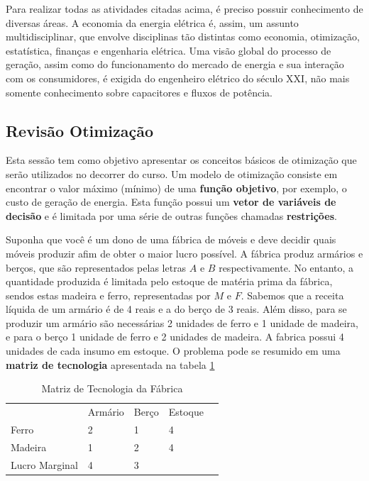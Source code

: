 Para realizar todas as atividades citadas acima, é preciso possuir
conhecimento de diversas áreas. A economia da energia elétrica é,
assim, um assunto multidisciplinar, que envolve disciplinas tão distintas
como economia, otimização, estatística, finanças e engenharia elétrica.
Uma visão global do processo de geração, assim como do funcionamento
do mercado de energia e sua interação com os consumidores, é exigida
do engenheiro elétrico do século XXI, não mais somente conhecimento
sobre capacitores e fluxos de potência. 




\subsection{Revisão Otimização}
Esta sessão tem como objetivo apresentar os conceitos básicos de otimização que serão utilizados no decorrer do curso. Um modelo de otimização consiste em encontrar o valor máximo (mínimo) de uma \textbf{função objetivo}, por exemplo, o custo de geração de energia. Esta função possui um \textbf{vetor de variáveis de decisão} e é limitada por uma série de outras funções chamadas \textbf{restrições}.

Suponha que você é um dono de uma fábrica de móveis e deve decidir quais móveis produzir afim de obter o maior lucro possível. A fábrica produz armários e berços, que são representados pelas letras $A$ e $B$ respectivamente. No entanto, a quantidade produzida é limitada pelo estoque de matéria prima da fábrica, sendos estas madeira e ferro, representadas por $M$ e $F$. Sabemos que a receita líquida de um armário é de 4 reais e a do berço de 3 reais. Além disso, para se produzir um armário são necessárias 2 unidades de ferro e 1 unidade de madeira, e para o berço 1 unidade de ferro e 2 unidades de madeira. A fabrica possui 4 unidades de cada insumo em estoque. O problema pode se resumido em uma \textbf{matriz de tecnologia} apresentada na tabela \ref{tabela1}

\begin{table}[H]
\begin{center}
\label{tabela1}

\begin{tabular}{l|l|l|ll}
               & Armário & Berço & Estoque &  \\ \cline{1-4}
Ferro          & 2       & 1     & 4       &  \\ \cline{1-4}
Madeira        & 1       & 2     & 4       &  \\ \cline{1-4}
Lucro Marginal & 4       & 3     &         & 
\end{tabular}
\caption{Matriz de Tecnologia da Fábrica}
\end{center}
\end{table}

